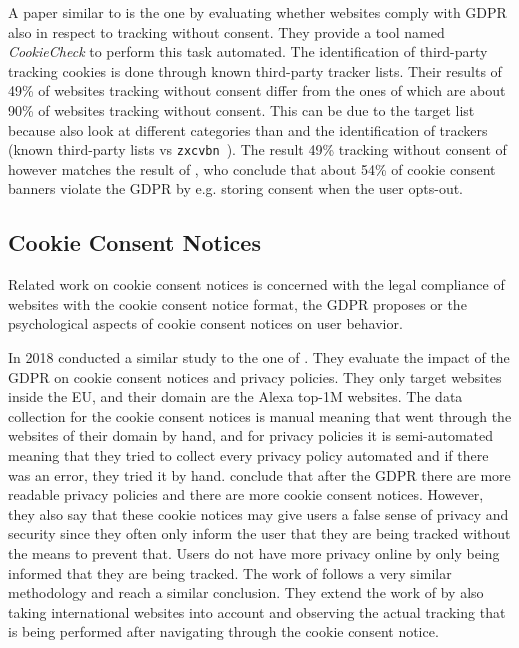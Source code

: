 A paper similar to  is the one by  evaluating whether websites comply
with GDPR also in respect to tracking without consent. They provide a tool named \emph{CookieCheck} to perform this task
automated. The identification of third-party tracking cookies is done through known third-party tracker lists. Their
results of 49\% of websites tracking without consent differ from the ones of \citeauthor{sanchez2019can} which are about
90\% of websites tracking without consent. This can be due to the target list because \citeauthor{trevisan20194} also
look at different categories than \citeauthor{sanchez2019can} and the identification of trackers (known third-party
lists vs \texttt{zxcvbn}~\cite{wheeler2016zxcvbn}). The result 49\% tracking without consent of
\citeauthor{trevisan20194} however matches the result of , who conclude that about 54\% of cookie consent
banners violate the GDPR by e.g. storing consent when the user opts-out.

\subsection{Cookie Consent Notices}

Related work on cookie consent notices is concerned with the legal compliance of websites with the cookie consent notice
format, the GDPR proposes or the psychological aspects of cookie consent notices on user behavior.

In 2018  conducted a similar study to the one of . They evaluate the impact of the
GDPR on cookie consent notices and privacy policies. They only target websites inside the EU, and their domain are the
Alexa top-1M websites. The data collection for the cookie consent notices is manual meaning that
\citeauthor{degeling2018we} went through the websites of their domain by hand, and for privacy policies it is
semi-automated meaning that they tried to collect every privacy policy automated and if there was an error, they tried
it by hand. \citeauthor{degeling2018we} conclude that after the GDPR there are more readable privacy policies
and there are more cookie consent notices. However, they also say that these cookie notices may give users a false sense
of privacy and security since they often only inform the user that they are being tracked without the means to prevent
that. Users do not have more privacy online by only being informed that they are being tracked. The work of
 follows a very similar methodology and reach a similar conclusion. They extend the work of
 by also taking international websites into account and observing the actual tracking that is being
performed after navigating through the cookie consent notice.

